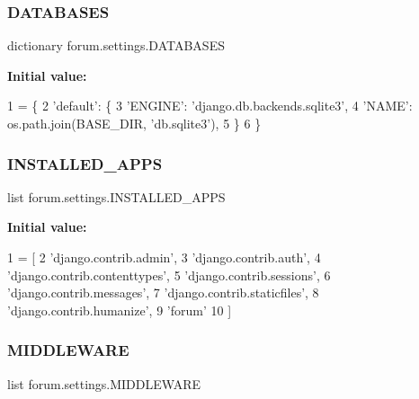 \subsubsection{\texorpdfstring{D\+A\+T\+A\+B\+A\+S\+ES}{DATABASES}}
{\footnotesize\ttfamily dictionary forum.\+settings.\+D\+A\+T\+A\+B\+A\+S\+ES}

{\bfseries Initial value\+:}
\begin{DoxyCode}
1 =  \{
2     \textcolor{stringliteral}{'default'}: \{
3         \textcolor{stringliteral}{'ENGINE'}: \textcolor{stringliteral}{'django.db.backends.sqlite3'},
4         \textcolor{stringliteral}{'NAME'}: os.path.join(BASE\_DIR, \textcolor{stringliteral}{'db.sqlite3'}),
5     \}
6 \}
\end{DoxyCode}
\mbox{\label{namespaceforum_1_1settings_aea0d4c95e90f9a496ac628c44fecc50b}} 
\subsubsection{\texorpdfstring{I\+N\+S\+T\+A\+L\+L\+E\+D\+\_\+\+A\+P\+PS}{INSTALLED\_APPS}}
{\footnotesize\ttfamily list forum.\+settings.\+I\+N\+S\+T\+A\+L\+L\+E\+D\+\_\+\+A\+P\+PS}

{\bfseries Initial value\+:}
\begin{DoxyCode}
1 =  [
2     \textcolor{stringliteral}{'django.contrib.admin'},
3     \textcolor{stringliteral}{'django.contrib.auth'},
4     \textcolor{stringliteral}{'django.contrib.contenttypes'},
5     \textcolor{stringliteral}{'django.contrib.sessions'},
6     \textcolor{stringliteral}{'django.contrib.messages'},
7     \textcolor{stringliteral}{'django.contrib.staticfiles'},
8     \textcolor{stringliteral}{'django.contrib.humanize'},
9     \textcolor{stringliteral}{'forum'}
10 ]
\end{DoxyCode}
\mbox{\label{namespaceforum_1_1settings_a7946849e6b6ca6cec98185c4f59cfd5b}} 
\subsubsection{\texorpdfstring{M\+I\+D\+D\+L\+E\+W\+A\+RE}{MIDDLEWARE}}
{\footnotesize\ttfamily list forum.\+settings.\+M\+I\+D\+D\+L\+E\+W\+A\+RE}


